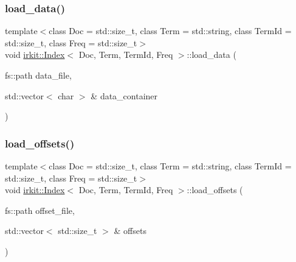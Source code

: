 \mbox{\label{classirkit_1_1Index_ad3f9d2490c25541bb7906cb17f76a0c2}} 
\subsubsection{\texorpdfstring{load\+\_\+data()}{load\_data()}}
{\footnotesize\ttfamily template$<$class Doc  = std\+::size\+\_\+t, class Term  = std\+::string, class Term\+Id  = std\+::size\+\_\+t, class Freq  = std\+::size\+\_\+t$>$ \\
void \hyperlink{classirkit_1_1Index}{irkit\+::\+Index}$<$ Doc, Term, Term\+Id, Freq $>$\+::load\+\_\+data (\begin{DoxyParamCaption}\item[{fs\+::path}]{data\+\_\+file,  }\item[{std\+::vector$<$ char $>$ \&}]{data\+\_\+container }\end{DoxyParamCaption})\hspace{0.3cm}{\ttfamily [inline]}}

\mbox{\label{classirkit_1_1Index_a1d44636a2174a740a9e648d2587254a6}} 
\subsubsection{\texorpdfstring{load\+\_\+offsets()}{load\_offsets()}}
{\footnotesize\ttfamily template$<$class Doc  = std\+::size\+\_\+t, class Term  = std\+::string, class Term\+Id  = std\+::size\+\_\+t, class Freq  = std\+::size\+\_\+t$>$ \\
void \hyperlink{classirkit_1_1Index}{irkit\+::\+Index}$<$ Doc, Term, Term\+Id, Freq $>$\+::load\+\_\+offsets (\begin{DoxyParamCaption}\item[{fs\+::path}]{offset\+\_\+file,  }\item[{std\+::vector$<$ std\+::size\+\_\+t $>$ \&}]{offsets }\end{DoxyParamCaption})\hspace{0.3cm}{\ttfamily [inline]}}

\mbox{\label{classirkit_1_1Index_af8a4dd64292b2b7f7359ef1e62d75147}} 

